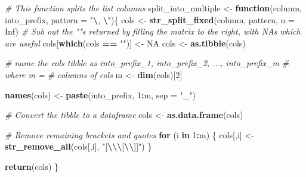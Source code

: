 \documentclass[
  twocolumn]{article}
\newenvironment{Shaded}{\begin{snugshade}}{\end{snugshade}}
\newcommand{\AttributeTok}[1]{\textcolor[rgb]{0.13,0.29,0.53}{#1}}
\newcommand{\CommentTok}[1]{\textcolor[rgb]{0.56,0.35,0.01}{\textit{#1}}}
\newcommand{\ConstantTok}[1]{\textcolor[rgb]{0.56,0.35,0.01}{#1}}
\newcommand{\ControlFlowTok}[1]{\textcolor[rgb]{0.13,0.29,0.53}{\textbf{#1}}}
\newcommand{\DecValTok}[1]{\textcolor[rgb]{0.00,0.00,0.81}{#1}}
\newcommand{\FunctionTok}[1]{\textcolor[rgb]{0.13,0.29,0.53}{\textbf{#1}}}
\newcommand{\NormalTok}[1]{#1}
\newcommand{\OtherTok}[1]{\textcolor[rgb]{0.56,0.35,0.01}{#1}}
\newcommand{\SpecialCharTok}[1]{\textcolor[rgb]{0.81,0.36,0.00}{\textbf{#1}}}
\newcommand{\StringTok}[1]{\textcolor[rgb]{0.31,0.60,0.02}{#1}}
\begin{document}
\begin{Shaded}
\begin{Highlighting}[]
\CommentTok{\# This function splits the list columns}
\NormalTok{split\_into\_multiple }\OtherTok{\textless{}{-}} \ControlFlowTok{function}\NormalTok{(column, into\_prefix, }\AttributeTok{pattern =} \StringTok{"}\SpecialCharTok{\textbackslash{}\textquotesingle{}}\StringTok{, }\SpecialCharTok{\textbackslash{}\textquotesingle{}}\StringTok{"}\NormalTok{)\{}
\NormalTok{  cols }\OtherTok{\textless{}{-}} \FunctionTok{str\_split\_fixed}\NormalTok{(column, pattern, }\AttributeTok{n =} \ConstantTok{Inf}\NormalTok{)}
  \CommentTok{\# Sub out the ""\textquotesingle{}s returned by filling the matrix to the right, with NAs which are useful}
\NormalTok{  cols[}\FunctionTok{which}\NormalTok{(cols }\SpecialCharTok{==} \StringTok{""}\NormalTok{)] }\OtherTok{\textless{}{-}} \ConstantTok{NA}
\NormalTok{  cols }\OtherTok{\textless{}{-}} \FunctionTok{as.tibble}\NormalTok{(cols)}

  \CommentTok{\# name the \textquotesingle{}cols\textquotesingle{} tibble as \textquotesingle{}into\_prefix\_1\textquotesingle{}, \textquotesingle{}into\_prefix\_2\textquotesingle{}, ..., \textquotesingle{}into\_prefix\_m\textquotesingle{} }
  \CommentTok{\# where m = \# columns of \textquotesingle{}cols\textquotesingle{}}
\NormalTok{  m }\OtherTok{\textless{}{-}} \FunctionTok{dim}\NormalTok{(cols)[}\DecValTok{2}\NormalTok{]}

  \FunctionTok{names}\NormalTok{(cols) }\OtherTok{\textless{}{-}} \FunctionTok{paste}\NormalTok{(into\_prefix, }\DecValTok{1}\SpecialCharTok{:}\NormalTok{m, }\AttributeTok{sep =} \StringTok{"\_"}\NormalTok{)}
  
  \CommentTok{\# Convert the tibble to a dataframe}
\NormalTok{  cols }\OtherTok{\textless{}{-}} \FunctionTok{as.data.frame}\NormalTok{(cols)}
  
  \CommentTok{\# Remove remaining brackets and quotes}
  \ControlFlowTok{for}\NormalTok{ (i }\ControlFlowTok{in} \DecValTok{1}\SpecialCharTok{:}\NormalTok{m) \{}
\NormalTok{    cols[,i] }\OtherTok{\textless{}{-}} \FunctionTok{str\_remove\_all}\NormalTok{(cols[,i], }\StringTok{"[}\SpecialCharTok{\textbackslash{}\textquotesingle{}\textbackslash{}\textbackslash{}}\StringTok{[}\SpecialCharTok{\textbackslash{}\textbackslash{}}\StringTok{]]"}\NormalTok{)}
\NormalTok{  \}}
  
  \FunctionTok{return}\NormalTok{(cols)}
\NormalTok{\}}
\end{Highlighting}
\end{Shaded}
\end{document}
